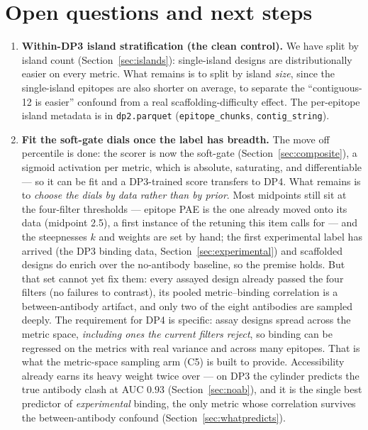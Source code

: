\section{Open questions and next steps}\label{sec:open}

\begin{enumerate}
\item \textbf{Within-DP3 island stratification (the clean control).} We have split by island
count (Section~\ref{sec:islands}): single-island designs are distributionally easier on every
metric. What remains is to split by island \emph{size}, since the single-island epitopes are
also shorter on average, to separate the ``contiguous-12 is easier'' confound from a real
scaffolding-difficulty effect. The per-epitope island metadata is in \texttt{dp2.parquet}
(\texttt{epitope\_chunks}, \texttt{contig\_string}).

\item \textbf{Fit the soft-gate dials once the label has breadth.} The move off percentile is done:
the scorer is now the soft-gate (Section~\ref{sec:composite}), a sigmoid activation per metric, which
is absolute, saturating, and differentiable --- so it can be fit and a DP3-trained score transfers to
DP4. What remains is to \emph{choose the dials by data rather than by prior}. Most midpoints still sit at the
four-filter thresholds --- epitope PAE is the one already moved onto its data (midpoint \num{2.5}), a
first instance of the retuning this item calls for --- and the steepnesses $k$ and weights are set by
hand; the first experimental label
has arrived (the DP3 binding data, Section~\ref{sec:experimental}) and scaffolded designs do enrich over
the no-antibody baseline, so the premise holds. But that set cannot yet fix them: every assayed design
already passed the four filters (no failures to contrast), its pooled metric--binding correlation is a
between-antibody artifact, and only two of the eight antibodies are sampled deeply. The requirement for
DP4 is specific: assay designs spread across the metric space, \emph{including ones the current filters
reject}, so binding can be regressed on the metrics with real variance and across many epitopes. That is
what the metric-space sampling arm (C5) is built to provide. Accessibility already earns its heavy weight
twice over --- on DP3 the cylinder predicts the true antibody clash at AUC $0.93$
(Section~\ref{sec:noab}), and it is the single best predictor of \emph{experimental} binding, the only
metric whose correlation survives the between-antibody confound (Section~\ref{sec:whatpredicts}).


\end{enumerate}
